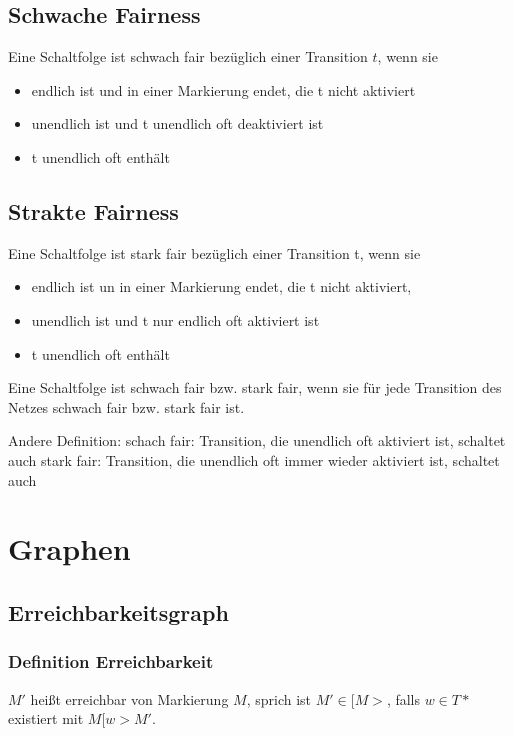 \documentclass[12pt]{scrreprt}
\begin{document}
\section{Schwache Fairness}
Eine Schaltfolge ist schwach fair bezüglich einer Transition $t$, wenn sie
\begin{itemize}
	\item endlich ist und in einer Markierung endet, die t nicht aktiviert
	\item unendlich ist und t unendlich oft deaktiviert ist
	\item t unendlich oft enthält
\end{itemize}

\section{Strakte Fairness}
Eine Schaltfolge ist stark fair bezüglich einer Transition t, wenn sie
\begin{itemize}
	\item endlich ist un in einer Markierung endet, die t nicht aktiviert,
	\item unendlich ist und t nur endlich oft aktiviert ist
	\item t unendlich oft enthält
\end{itemize}

Eine Schaltfolge ist schwach fair bzw. stark fair, wenn sie für jede Transition des Netzes schwach fair bzw. stark fair ist.

Andere Definition:\newline
schach fair:\newline
\tabto{0.5cm}Transition, die unendlich oft aktiviert ist, schaltet auch\newline
stark fair:\newline
\tabto{0.5cm}Transition, die unendlich oft immer wieder aktiviert ist, schaltet auch

\chapter{Graphen}
\section{Erreichbarkeitsgraph}
\subsection{Definition Erreichbarkeit}
$M'$ heißt erreichbar von Markierung $M$, sprich ist $M' \in [M>$, falls $w \in T*$ existiert mit $M [w> M'$.
\end{document}
